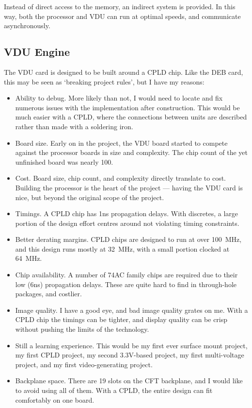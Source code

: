 Instead of direct access to the memory, an indirect system is provided. In this
way, both the processor and VDU can run at optimal speeds, and communicate
asynchronously.


\subsection{VDU Engine}

The VDU card is designed to be built around a CPLD chip. Like the DEB card,
this may be seen as ‘breaking project rules’, but I have my reasons:

\begin{itemize}
\item Ability to debug. More likely than not, I would need to locate and fix
  numerous issues with the implementation after construction. This would be
  much easier with a CPLD, where the connections between units are described
  rather than made with a soldering iron.
\item Board size. Early on in the project, the VDU board started to compete
  against the processor boards in size and complexity. The chip count of the
  yet unfinished board was nearly 100.
\item Cost. Board size, chip count, and complexity directly translate to
  cost. Building the processor is the heart of the project — having the VDU
  card is nice, but beyond the original scope of the project.
\item Timings. A CPLD chip has 1ns propagation delays. With discretes,
  a large portion of the design effort centres around not violating
  timing constraints.
\item Better derating margins. CPLD chips are designed to run at over
  100~MHz, and this design runs mostly at 32~MHz, with a small portion
  clocked at 64~MHz.
\item Chip availability. A number of 74AC family chips are required
  due to their low (6ns) propagation delays. These are quite hard to
  find in through-hole packages, and costlier.
\item Image quality. I have a good eye, and bad image quality grates on me. With a
  CPLD chip the timings can be tighter, and display quality can be crisp
  without pushing the limits of the technology.
\item Still a learning experience. This would be my first ever surface mount
  project, my first CPLD project, my second 3.3V-based project, my first
  multi-voltage project, and my first video-generating project.
\item Backplane space. There are 19 slots on the CFT backplane, and I would
  like to avoid using all of them. With a CPLD, the entire design can fit
  comfortably on one board.
\end{itemize}

